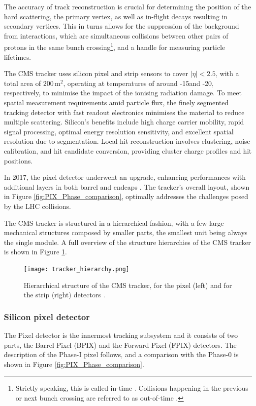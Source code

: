 The accuracy of track reconstruction is crucial for determining the position of the hard scattering, the primary vertex, as well as in-flight decays resulting in secondary vertices.
This in turns allows for the suppression of the background from \pileup interactions,
which are simultaneous collisions between other pairs of protons in the same bunch crossing\footnote{
Strictly speaking, this is called in-time \pileup.
Collisions happening in the previous or next bunch crossing are referred to as out-of-time \pileup.
},
and a handle for measuring particle lifetimes.

The CMS tracker uses silicon pixel and strip sensors to cover $|\eta| < 2.5$, with a total area of $200\, \mathrm{m}^2$,
operating at temperatures of around -15\Celsius and -20\Celsius, respectively, to minimise the impact of the ionising radiation damage.
To meet spatial measurement requirements amid particle flux, the finely segmented tracking detector with fast readout electronics minimises the material to reduce multiple scattering.
Silicon's benefits include high charge carrier mobility, rapid signal processing, optimal energy resolution sensitivity, and excellent spatial resolution due to segmentation.
Local hit reconstruction involves clustering, noise calibration, and hit candidate conversion, providing cluster charge profiles and hit positions.

In 2017, the pixel detector underwent an upgrade, enhancing performances with additional layers in both barrel and endcaps \cite{CMS-TDR-11}.
The tracker's overall layout, shown in Figure \ref{fig:PIX_Phase_comparison}, optimally addresses the challenges posed by the LHC collisions.

The CMS tracker is structured in a hierarchical fashion, with a few large mechanical structures composed by smaller parts,
the smallest unit being always the single module.
A full overview of the structure hierarchies of the CMS tracker is shown in Figure \ref{fig:tracker_hierarchy}.

\begin{figure}
  \centering
  \texttt{[image: tracker\_hierarchy.png]}
  \caption{Hierarchical structure of the CMS tracker, for the pixel (left) and for the strip (right) detectors \cite{CMS-NOTE-2009-002}.}
  \label{fig:tracker_hierarchy}
\end{figure}

\subsubsection{Silicon pixel detector}
The Pixel detector is the innermost tracking subsystem and it consists of two parts, the Barrel Pixel (BPIX) and the Forward Pixel (FPIX) detectors.
The description of the Phase-I pixel follows, and a comparison with the Phase-0 is shown in Figure \ref{fig:PIX_Phase_comparison}.


